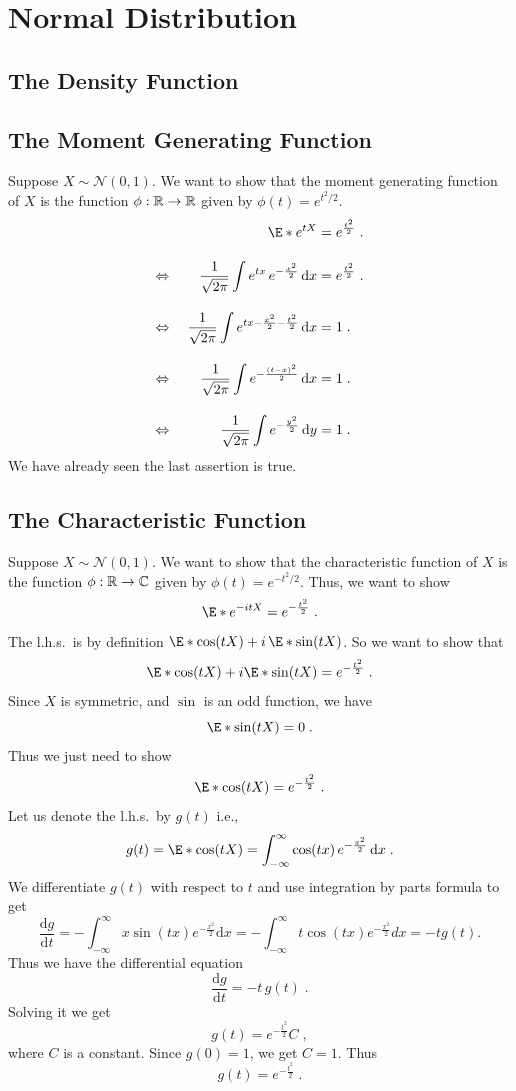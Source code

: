\chapter{Normal Distribution}

\section{The Density Function}


\newpage

\section{The Moment Generating Function}

Suppose $X\sim\mathcal{N}(0,1)$. We want to show that the moment generating function of $X$ is the function $\phi:\mathbb{R}\to\mathbb{R}$ given by $\phi(t)=e^{t^2/2}$.
\begin{alignat*}{3}
&& \E*{e^{tX}} ={} & e^{\frac{t^2}{2}} \;. \\[1em]
\Leftrightarrow{} && \frac{1}{\sqrt{2\pi}} \int e^{tx} \, e^{-\frac{x^2}{2}} \, \mathrm{d}x ={} & e^{\frac{t^2}{2}} \;. \\[1em]
\Leftrightarrow{} && \frac{1}{\sqrt{2\pi}} \int e^{tx - \frac{x^2}{2} - \frac{t^2}{2} } \, \mathrm{d}x ={} & 1 \;.\\[1em]
\Leftrightarrow{} && \frac{1}{\sqrt{2\pi}} \int e^{-\frac{(t-x)^2}{2}} \, \mathrm{d}x ={} & 1 \;.\\[1em]
\Leftrightarrow{} && \frac{1}{\sqrt{2\pi}} \int e^{-\frac{y^2}{2}} \, \mathrm{d}y ={} & 1 \;.
\end{alignat*}
We have already seen the last assertion is true.

\section{The Characteristic Function}

Suppose $X\sim\mathcal{N}(0,1)$. We want to show that the characteristic function of $X$ is the function $\phi:\mathbb{R}\to\mathbb{C}$ given by $\phi(t)=e^{-t^2/2}$. Thus, we want to show
\[
\E*{ e^{-itX} } = e^{ - \frac{t^2}{2} } \;.
\]
The l.h.s.\ is by definition $\E*{\cos(tX)}+i \, \E*{\sin(tX)}$. So we want to show that
\[
\E*{\cos(tX)}+i\E*{\sin(tX)} = e^{ - \frac{t^2}{2} } \;.
\]
Since $X$ is symmetric, and $\sin$ is an odd function, we have
\[
\E*{\sin(tX)} = 0 \;.
\]
Thus we just need to show
\[
\E*{\cos(tX)} =  e^{ - \frac{t^2}{2} } \;.
\]
Let us denote the l.h.s.\ by $g(t)$ i.e., 
\[
g(t) = \E*{\cos(tX)} = \int_{-\infty}^{\infty} \cos(tx)\, e^{-\frac{x^2}{2}}\, \mathrm{d}x \;.
\]
We differentiate $g(t)$ with respect to $t$ and use integration by parts formula to get
\[
\frac{\mathrm{d}g}{\mathrm{d}t} = - \int_{-\infty}^{\infty} x\sin(tx)e^{-\frac{x^2}{2}} \mathrm{d}x = - \int_{-\infty}^{\infty} t \cos(tx) e^{-\frac{x^2}{2}} dx = -t g(t).
\]
Thus we have the differential equation 
\[
\frac{\mathrm{d}g}{\mathrm{d}t} = -t \, g(t) \;.
\]
Solving it we get
\[
g(t) = e^{-\frac{t^2}{2}} C\;,
\]
where $C$ is a constant. Since $g(0) = 1$, we get $C=1$. Thus
\[
g(t) = e^{-\frac{t^2}{2}} \;.
\]

